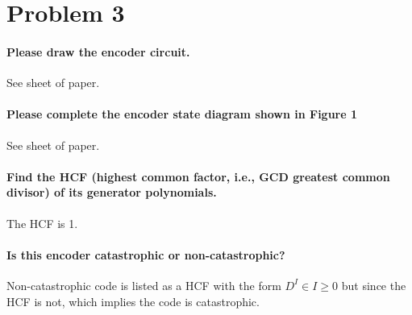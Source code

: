 \documentclass[Main]{subfiles}
\begin{document}
\section*{Problem 3}

\paragraph{Please draw the encoder circuit.}
See sheet of paper.

\paragraph{Please complete the encoder state diagram shown in Figure 1}
See sheet of paper.

\paragraph{Find the HCF (highest common factor, i.e., GCD greatest common divisor) of its generator polynomials.}
The HCF is 1.


\paragraph{Is this encoder catastrophic or non-catastrophic?}
Non-catastrophic code is listed as a HCF with the form $D^I \in I \geq 0$ but since the HCF is not, which implies the code is catastrophic.
\end{document}
